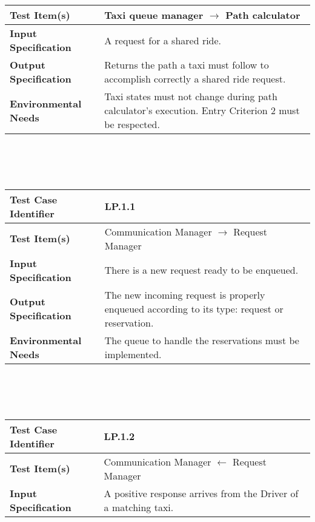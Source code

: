 {\begin{tabularx}{\textwidth}{l X}
    \textbf{Test Item(s)} & Taxi queue manager $\rightarrow$ Path calculator\\
    \hline 
    
    \textbf{Input Specification} & A request for a shared ride.\\
    \hline 
    
    \textbf{Output Specification} &  Returns the path a taxi must follow to accomplish correctly a shared ride request.\\
    \hline 
    
    \textbf{Environmental Needs} &  Taxi states must not change during path calculator's execution. Entry Criterion 2 must be respected.\\
    \hline

\end{tabularx}
\\ \\ \\
\begin{tabularx}{\textwidth}{l X}
    \hline 
    \textbf{Test Case Identifier} & LP.1.1\\ 
    \hline 
    
    \textbf{Test Item(s)} & Communication Manager $\rightarrow$ Request Manager\\
    \hline 
    
    \textbf{Input Specification} & There is a new request ready to be enqueued. \\
    \hline 
    
    \textbf{Output Specification} & The new incoming request is properly enqueued according to its type: request or reservation.    \\
    \hline 
    
    \textbf{Environmental Needs} & The  queue to handle the reservations must be implemented. \\
    \hline

\end{tabularx}
\\ \\ \\
\begin{tabularx}{\textwidth}{l X}
    \hline 
    \textbf{Test Case Identifier} & LP.1.2\\ 
    \hline 
    
    \textbf{Test Item(s)} & Communication Manager $\leftarrow$ Request Manager\\
    \hline 
    
    \textbf{Input Specification} & A positive response arrives from the Driver of a matching taxi. \\
    \hline 
    

\end{tabularx}}
